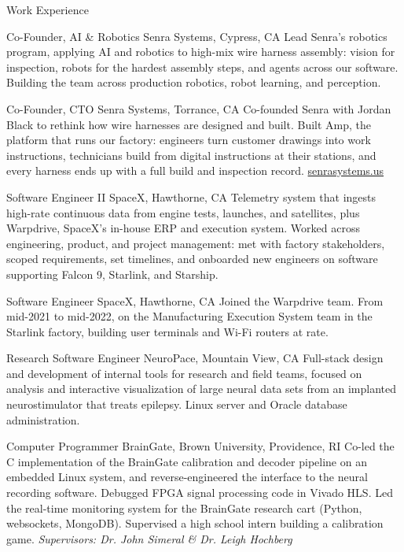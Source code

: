 \documentclass{FormatCV}
\begin{document}
\begin{newSection}{Work Experience}

{Co-Founder, AI \& Robotics}
{Senra Systems, Cypress, CA}
{Lead Senra's robotics program, applying AI and robotics to high-mix wire harness assembly: vision for inspection, robots for the hardest assembly steps, and agents across our software. Building the team across production robotics, robot learning, and perception.}

{Co-Founder, CTO}
{Senra Systems, Torrance, CA}
{Co-founded Senra with Jordan Black to rethink how wire harnesses are designed and built. Built Amp, the platform that runs our factory: engineers turn customer drawings into work instructions, technicians build from digital instructions at their stations, and every harness ends up with a full build and inspection record. \href{https://www.senrasystems.us}{senrasystems.us}}

{Software Engineer II}
{SpaceX, Hawthorne, CA}
{Telemetry system that ingests high-rate continuous data from engine tests, launches, and satellites, plus Warpdrive, SpaceX's in-house ERP and execution system. Worked across engineering, product, and project management: met with factory stakeholders, scoped requirements, set timelines, and onboarded new engineers on software supporting Falcon 9, Starlink, and Starship.}

{Software Engineer}
{SpaceX, Hawthorne, CA}
{Joined the Warpdrive team. From mid-2021 to mid-2022, on the Manufacturing Execution System team in the Starlink factory, building user terminals and Wi-Fi routers at rate.}

{Research Software Engineer}
{NeuroPace, Mountain View, CA}
{Full-stack design and development of internal tools for research and field teams, focused on analysis and interactive visualization of large neural data sets from an implanted neurostimulator that treats epilepsy. Linux server and Oracle database administration.}

{Computer Programmer}
{BrainGate, Brown University, Providence, RI}
{Co-led the C implementation of the BrainGate calibration and decoder pipeline on an embedded Linux system, and reverse-engineered the interface to the neural recording software. Debugged FPGA signal processing code in Vivado HLS. Led the real-time monitoring system for the BrainGate research cart (Python, websockets, MongoDB). Supervised a high school intern building a calibration game. \emph{Supervisors: Dr. John Simeral \& Dr. Leigh Hochberg}}


\end{newSection}
\end{document}
